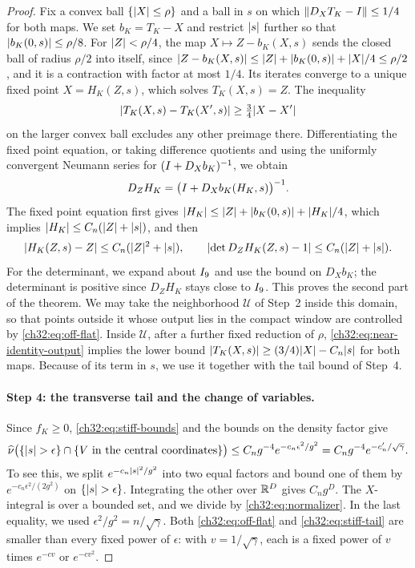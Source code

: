 \begin{proof}
Fix a convex ball $\{\lvert X\rvert\le\rho\}$ and a ball in $s$ on which $\lVert D_XT_K-I\rVert\le1/4$ for both maps. We set $b_K=T_K-X$ and restrict $\lvert s\rvert$ further so that $\lvert b_K(0,s)\rvert\le\rho/8$. For $\lvert Z\rvert<\rho/4$, the map $X\mapsto Z-b_K(X,s)$ sends the closed ball of radius $\rho/2$ into itself, since $\lvert Z-b_K(X,s)\rvert\le\lvert Z\rvert+\lvert b_K(0,s)\rvert+\lvert X\rvert/4\le\rho/2$, and it is a contraction with factor at most $1/4$. Its iterates converge to a unique fixed point $X=H_K(Z,s)$, which solves $T_K(X,s)=Z$. The inequality
\[
 \lvert T_K(X,s)-T_K(X',s)\rvert\ge\tfrac34\lvert X-X'\rvert
\]
on the larger convex ball excludes any other preimage there. Differentiating the fixed point equation, or taking difference quotients and using the uniformly convergent Neumann series for $(I+D_Xb_K)^{-1}$, we obtain
\[
 D_ZH_K=\bigl(I+D_Xb_K(H_K,s)\bigr)^{-1}.
\]
The fixed point equation first gives $\lvert H_K\rvert\le\lvert Z\rvert+\lvert b_K(0,s)\rvert+\lvert H_K\rvert/4$, which implies $\lvert H_K\rvert\le C_n(\lvert Z\rvert+\lvert s\rvert)$, and then
\begin{equation}\label{ch32:eq:inverse-output}
 \lvert H_K(Z,s)-Z\rvert\le C_n(\lvert Z\rvert^2+\lvert s\rvert),\qquad\lvert \det D_ZH_K(Z,s)-1\rvert\le C_n(\lvert Z\rvert+\lvert s\rvert).
\end{equation}
For the determinant, we expand about $I_9$ and use the bound on $D_Xb_K$; the determinant is positive since $D_ZH_K$ stays close to $I_9$. This proves the second part of the theorem. We may take the neighborhood $\mathcal U$ of Step~2 inside this domain, so that points outside it whose output lies in the compact window are controlled by \eqref{ch32:eq:off-flat}. Inside $\mathcal U$, after a further fixed reduction of $\rho$, \eqref{ch32:eq:near-identity-output} implies the lower bound $\lvert T_K(X,s)\rvert\ge(3/4)\lvert X\rvert-C_n\lvert s\rvert$ for both maps. Because of its term in $s$, we use it together with the tail bound of Step~4.

\paragraph{Step 4: the transverse tail and the change of variables.}
Since $f_K\ge0$, \eqref{ch32:eq:stiff-bounds} and the bounds on the density factor give
\begin{equation}\label{ch32:eq:stiff-tail}
 \widehat\nu\bigl(\{\lvert s\rvert>\epsilon\}\cap\{V\text{ in the central coordinates}\}\bigr)\le C_ng^{-4}e^{-c_n\epsilon^2/g^2}=C_ng^{-4}e^{-c_n'/\sqrt\gamma}.
\end{equation}
To see this, we split $e^{-c_n\lvert s\rvert^2/g^2}$ into two equal factors and bound one of them by $e^{-c_n\epsilon^2/(2g^2)}$ on $\{\lvert s\rvert>\epsilon\}$. Integrating the other over $\mathbb R^D$ gives $C_ng^D$. The $X$-integral is over a bounded set, and we divide by \eqref{ch32:eq:normalizer}. In the last equality, we used $\epsilon^2/g^2=n/\sqrt\gamma$. Both \eqref{ch32:eq:off-flat} and \eqref{ch32:eq:stiff-tail} are smaller than every fixed power of $\epsilon$: with $v=1/\sqrt\gamma$, each is a fixed power of $v$ times $e^{-cv}$ or $e^{-cv^2}$.


\end{proof}
